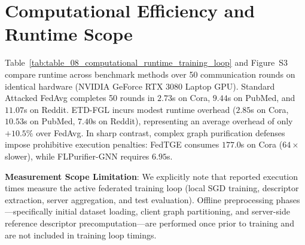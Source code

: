 \section{Computational Efficiency and Runtime Scope}
\label{sec:computational_efficiency}
Table~\ref{tab:table_08_computational_runtime_training_loop} and Figure~S3 compare runtime across benchmark methods over 50 communication rounds on identical hardware (NVIDIA GeForce RTX 3080 Laptop GPU).
Standard Attacked FedAvg completes 50 rounds in $2.73$s on Cora, $9.44$s on PubMed, and $11.07$s on Reddit.
\textsc{ETD-FGL} incurs modest runtime overhead ($2.85$s on Cora, $10.53$s on PubMed, $7.40$s on Reddit), representing an average overhead of only $+10.5\%$ over FedAvg.
In sharp contrast, complex graph purification defenses impose prohibitive execution penalties: FedTGE consumes $177.0$s on Cora ($64\times$ slower), while FLPurifier-GNN requires $6.95$s.

\textbf{Measurement Scope Limitation}:
We explicitly note that reported execution times measure the active federated training loop (local SGD training, descriptor extraction, server aggregation, and test evaluation).
Offline preprocessing phases—specifically initial dataset loading, client graph partitioning, and server-side reference descriptor precomputation—are performed once prior to training and are not included in training loop timings.
